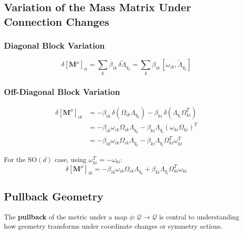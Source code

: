 \documentclass[12pt]{article}
\begin{document}
\subsection{Variation of the Mass Matrix Under Connection Changes}

\subsubsection{Diagonal Block Variation}

\begin{equation}
\delta[\mathbf{M}^\mu]_{ii} = \sum_k \beta_{ik} \, \delta\tilde{\Lambda}_{q_k} = \sum_k \beta_{ik} \, [\omega_{ik}, \tilde{\Lambda}_{q_k}]
\end{equation}

\subsubsection{Off-Diagonal Block Variation}

\begin{align}
\delta[\mathbf{M}^\mu]_{ik} &= -\beta_{ik} \, \delta(\Omega_{ik}\Lambda_{q_k}) - \beta_{ki} \, \delta(\Lambda_{q_i}\Omega_{ki}^T) \nonumber\\
&= -\beta_{ik}\omega_{ik}\Omega_{ik}\Lambda_{q_k} - \beta_{ki}\Lambda_{q_i}(\omega_{ki}\Omega_{ki})^T \nonumber\\
&= -\beta_{ik}\omega_{ik}\Omega_{ik}\Lambda_{q_k} - \beta_{ki}\Lambda_{q_i}\Omega_{ki}^T\omega_{ki}^T
\end{align}

For the $\mathrm{SO}(d)$ case, using $\omega_{ki}^T = -\omega_{ki}$:
\begin{equation}
\boxed{\delta[\mathbf{M}^\mu]_{ik} = -\beta_{ik}\omega_{ik}\Omega_{ik}\Lambda_{q_k} + \beta_{ki}\Lambda_{q_i}\Omega_{ki}^T\omega_{ki}}
\end{equation}

\subsection{Pullback Geometry}

The \textbf{pullback} of the metric under a map $\phi: \mathcal{Q} \to \mathcal{Q}$ is central to understanding how geometry transforms under coordinate changes or symmetry actions.
\end{document}

